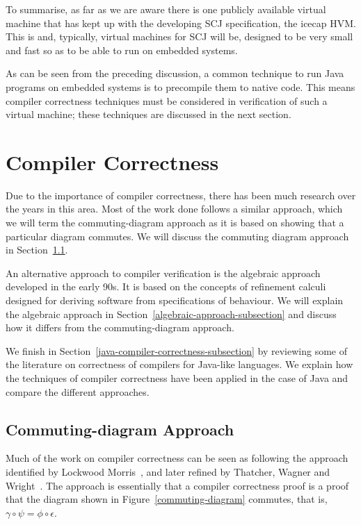 \documentclass[a4paper,10pt]{report}
\begin{document}
To summarise, as far as we are aware there is one publicly available
virtual machine that has kept up with the developing SCJ
specification, the icecap HVM.
This is and, typically, virtual machines for SCJ will be, designed to
be very small and fast so as to be able to run on embedded systems.

As can be seen from the preceding discussion, a common technique to
run Java programs on embedded systems is to precompile them to native
code.
This means compiler correctness techniques must be considered in
verification of such a virtual machine; these techniques are discussed
in the next section.

\section{Compiler Correctness}
\label{compiler-correctness-section}


Due to the importance of compiler correctness, there has been much
research over the years in this area.
Most of the work done follows a similar approach, which we will term
the commuting-diagram approach as it is based on showing that a
particular diagram commutes.
We will discuss the commuting diagram approach in
Section~\ref{commuting-diagram-subsection}.

An alternative approach to compiler verification is the algebraic
approach developed in the early 90s.
It is based on the concepts of refinement calculi designed for
deriving software from specifications of behaviour.
We will explain the algebraic approach in
Section~\ref{algebraic-approach-subsection} and discuss how it differs
from the commuting-diagram approach.

We finish in Section~\ref{java-compiler-correctness-subsection} by
reviewing some of the literature on correctness of compilers for
Java-like languages.
We explain how the techniques of compiler correctness have been
applied in the case of Java and compare the different approaches.

\subsection{Commuting-diagram Approach}
\label{commuting-diagram-subsection}

Much of the work on compiler correctness can be seen as following the
approach identified by Lockwood Morris~\cite{morris1973}, and later
refined by Thatcher, Wagner and Wright~\cite{thatcher1979}.
The approach is essentially that a compiler correctness proof is a
proof that the diagram shown in Figure~\ref{commuting-diagram}
commutes, that is, $\gamma \circ \psi = \phi \circ \epsilon$.
\end{document}
